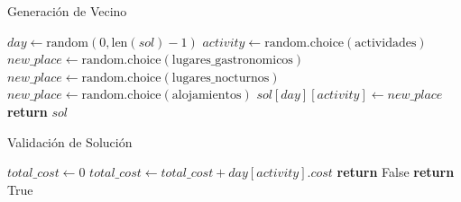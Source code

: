 \documentclass[10pt]{llncs}
\begin{document}
\begin{algorithm}
\caption{Generación de Vecino}
\label{alg:nb_gen}
\begin{algorithmic}[1]
\State $day \gets \text{random}(0, \text{len}(sol)-1)$
\State $activity \gets \text{random.choice}(\text{actividades})$
    \State $new\_place \gets \text{random.choice}(\text{lugares\_gastronomicos})$
    \State $new\_place \gets \text{random.choice}(\text{lugares\_nocturnos})$
\Else
    \State $new\_place \gets \text{random.choice}(\text{alojamientos})$
\EndIf
\State $sol[day][activity] \gets new\_place$
\State \textbf{return} $sol$
\EndProcedure
\end{algorithmic}
\end{algorithm}

\begin{algorithm}
\caption{Validación de Solución}
\label{alg:sol_valid}
\begin{algorithmic}[1]
    \State $total\_cost \gets 0$
        \State $total\_cost \gets total\_cost + day[activity].cost$
    \EndFor
        \State \textbf{return} False
    \EndIf
\EndFor
\State \textbf{return} True
\EndProcedure
\end{algorithmic}
\end{algorithm}
\end{document}
